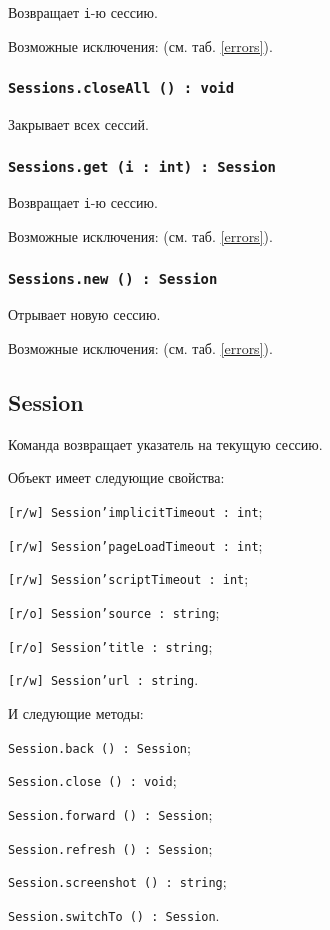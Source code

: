 Возвращает \texttt{i}-ю сессию.

Возможные исключения:  (см. таб. \ref{errors}).

\subsubsection{\texttt{Sessions.closeAll () : void}}

Закрывает всех сессий.

\subsubsection{\texttt{Sessions.get (i : int) : Session}}

Возвращает \texttt{i}-ю сессию.

Возможные исключения:  (см. таб. \ref{errors}).

\subsubsection{\texttt{Sessions.new () : Session}}

Отрывает новую сессию.

Возможные исключения:  (см. таб. \ref{errors}).

\subsection{{\color{orange} Session}}

Команда \session{} возвращает указатель на текущую сессию.

Объект \session{} имеет следующие свойства:
\begin{icItems}
	\item \texttt{[r/w] Session'implicitTimeout : int};
	\item \texttt{[r/w] Session'pageLoadTimeout : int};
	\item \texttt{[r/w] Session'scriptTimeout : int};
	\item \texttt{[r/o] Session'source : string};
	\item \texttt{[r/o] Session'title : string};
	\item \texttt{[r/w] Session'url : string}.
\end{icItems}

И следующие методы:
\begin{icItems}
	\item \texttt{Session.back () : Session};
	\item \texttt{Session.close () : void};
	\item \texttt{Session.forward () : Session};
	\item \texttt{Session.refresh () : Session};
	\item \texttt{Session.screenshot () : string};
	\item \texttt{Session.switchTo () : Session}.
\end{icItems}

